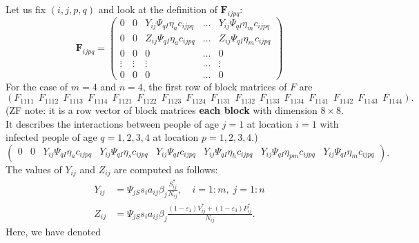 \documentclass[12pt]{amsart}
\theoremstyle{definition}
\begin{document}
Let us fix $(i,j,p,q)$ and look at the definition of $\bm F_{ijpq}$:
\begin{equation}\label{f-ijpq-1}
\bm{F}_{ijpq}=
\begin{pmatrix}
0 & 0 &  Y_{ij}\Psi_{qI}\eta_{a}c_{ijpq} & \ldots & Y_{ij}\Psi_{qI}\eta_{m}c_{ijpq}\\
0 & 0 &  Z_{ij}\Psi_{qI}\eta_{a}c_{ijpq} & \ldots & Z_{ij}\Psi_{qI}\eta_{m}c_{ijpq}\\
0 & 0 &  0 & \ldots & 0\\
\vdots & \vdots &  \vdots & \ldots & \vdots\\
0 & 0 &  0 & \ldots & 0
\end{pmatrix}
\end{equation}
For the case of $m=4$ and $n=4$, the first row  of block matrices of  $F$  are 
\tiny{
\[
(F_{1111} \ \ F_{1112} \ \ F_{1113} \  \ F_{1114} \  \
F_{1121} \ \  F_{1122} \ \ F_{1123}  \ \ F_{1124}   \ \
F_{1131} \ \   F_{1132} \ \  F_{1133} \ \  F_{1134} \ \
F_{1141} \ \   F_{1142} \ \  F_{1143} \ \  F_{1144}).
\]
}
{\color{red}(ZF note: it is a row vector of block matrices {\bf each block} with dimension $8\times 8$. It describes the interactions between people of age $j=1$ at location $i=1$ with infected people of age $q=1,2,3,4$ at location $p=1,2,3,4$.)}
\tiny{
\begin{equation}\label{F-def-1}
\begin{pmatrix} 
0 & 0 & Y_{ij}\Psi_{qI}\eta_{a}c_{ijpq} & Y_{ij}\Psi_{qI}\eta_{s}c_{ijpq} &Y_{ij}\Psi_{qI}c_{ijpq} 
&Y_{ij}\Psi_{qI}\eta_{h}c_{ijpq}  &
Y_{ij}\Psi_{qI}\eta_{pm}c_{ijpq}  & Y_{ij}\Psi_{qI}\eta_{m}c_{ijpq}  
\end{pmatrix}.
\end{equation}
}
The values of $Y_{ij}$ and $Z_{ij}$ are computed as follows:
\begin{equation}\label{yz-ij-def}
\begin{aligned}
Y_{ij} &= \Psi_{jS}s_ia_{ij}\beta_j \frac{S_{ij}^*}{N_{ij}}, \quad i=1:m,\; j=1:n\\
Z_{ij} &= \Psi_{jS} s_i a_{ij}\beta_j \frac{(1-\varepsilon_{1})V_{ij}^*+(1-\varepsilon_{3})P_{ij}^*}{N_{ij}}.
\end{aligned}
\end{equation}
Here, we have denoted
\end{document}

